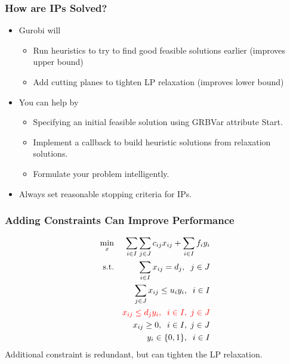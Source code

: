 \documentclass[12pt,handout]{beamer}
\begin{document}
\begin{frame}
\frametitle{How are IPs Solved?}
\begin{itemize}
\item Gurobi will
    \begin{itemize}
    \item Run heuristics to try to find good feasible solutions earlier (improves upper bound)
    \item Add cutting planes to tighten LP relaxation (improves lower bound)
    \end{itemize}
\item You can help by
    \begin{itemize}
    \item Specifying an initial feasible solution using GRBVar attribute Start.
    \item Implement a callback to build heuristic solutions from relaxation solutions.
    \item Formulate your problem intelligently.
    \end{itemize}
\item Always set reasonable stopping criteria for IPs.
\end{itemize}
\end{frame}

\begin{frame}
\frametitle{Adding Constraints Can Improve Performance}
\begin{eqnarray}
\min_{x} && \sum_{i \in I} \sum_{j \in J} c_{ij} x_{ij} + \sum_{i \in I} f_i y_i \nonumber \\
\mbox{s.t.} && \sum_{i \in I} x_{ij} = d_j,\;\;j \in J \nonumber \\
&& \sum_{j \in J} x_{ij} \le u_i y_i,\;\;i \in I \nonumber \\
&& {\color{red} x_{ij} \le d_j y_i,\;\;i \in I,\;j \in J} \nonumber \\
&& x_{ij} \ge 0, \;\;i \in I,\;j \in J \nonumber \\
&& y_i \in \{0, 1\},\;\;i \in I \nonumber
\end{eqnarray}
Additional constraint is redundant, but can tighten the LP relaxation.
\end{frame}
\end{document}
